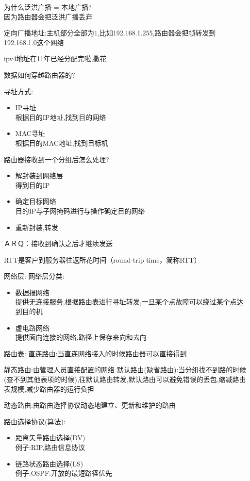 \documentclass[UTF8,a4paper]{ctexart}
\begin{document}
为什么泛洪广播 = 本地广播?\\
因为路由器会把泛洪广播丢弃

定向广播地址:主机部分全部为1,比如192.168.1.255,路由器会把帧转发到192.168.1.0这个网络

ipv4地址在11年已经分配完啦,撒花

数据如何穿越路由器的?

寻址方式:
\begin{itemize}
  \item IP寻址\\
  根据目的IP地址,找到目的网络
  \item MAC寻址\\
  根据目的MAC地址,找到目标机
\end{itemize}

路由器接收到一个分组后怎么处理?
\begin{itemize}
  \item 解封装到网络层\\得到目的IP
  \item 确定目标网络\\
  目的IP与子网掩码进行与操作确定目的网络
  \item 重新封装,转发
\end{itemize}




ＡＲＱ：接收到确认之后才继续发送

RTT是客户到服务器往返所花时间（round-trip time，简称RTT）

网络层:
网络层分类:
\begin{itemize}
  \item 数据报网络\\
  提供无连接服务,根据路由表进行寻址转发,一旦某个点故障可以绕过某个点达到目的机
  \item 虚电路网络 \\
  提供面向连接的网络,路径上保存来向和去向
\end{itemize}

路由表:
直连路由:当直连网络接入的时候路由器可以直接得到

静态路由:由管理人员直接配置的网络
默认路由(缺省路由):当分组找不到路的时候(查不到其他表项的时候),往默认路由转发,默认路由可以避免错误的丢包,缩减路由表规模,减少路由器的运行负担

动态路由:由路由选择协议动态地建立、更新和维护的路由

路由选择协议(算法):
\begin{itemize}
  \item 距离矢量路由选择(DV)\\
  例子:RIP,路由信息协议
  \item 链路状态路由选择(LS)\\
  例子:OSPF:开放的最短路径优先
\end{itemize}
\end{document}
